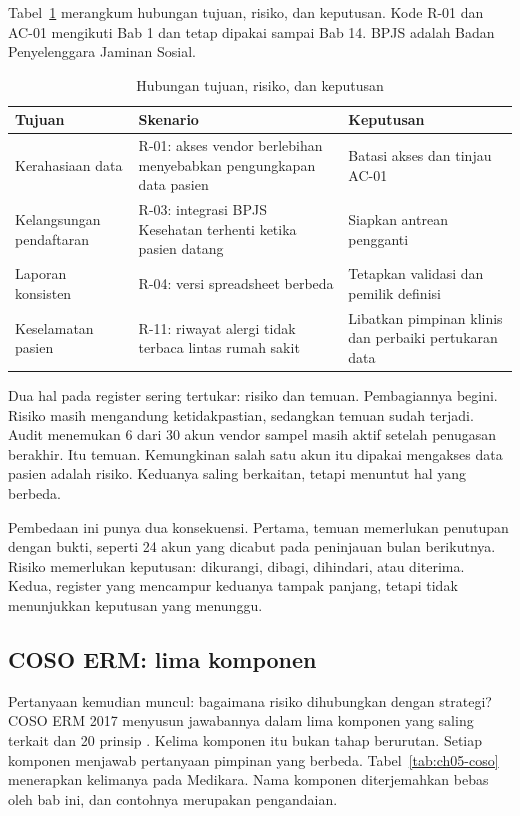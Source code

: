 Tabel~\ref{tab:ch05-tujuan} merangkum hubungan tujuan, risiko, dan keputusan. Kode R-01 dan AC-01
mengikuti Bab 1 dan tetap dipakai sampai Bab 14. BPJS adalah Badan Penyelenggara Jaminan Sosial.

\begin{table}[!htb]
  \centering\small
  \caption{Hubungan tujuan, risiko, dan keputusan}\label{tab:ch05-tujuan}
  \begin{tabularx}{\textwidth}{|>{\raggedright\arraybackslash}p{}|>{\raggedright\arraybackslash}X|>{\raggedright\arraybackslash}X|}
    \hline
    \textbf{Tujuan} & \textbf{Skenario} & \textbf{Keputusan} \\ \hline
    Kerahasiaan data & R-01: akses vendor berlebihan menyebabkan pengungkapan data pasien & Batasi
    akses dan tinjau AC-01 \\ \hline
    Kelangsungan pendaftaran & R-03: integrasi BPJS Kesehatan terhenti ketika pasien datang &
    Siapkan antrean pengganti \\ \hline
    Laporan konsisten & R-04: versi spreadsheet berbeda & Tetapkan validasi dan pemilik definisi \\
    \hline
    Keselamatan pasien & R-11: riwayat alergi tidak terbaca lintas rumah sakit & Libatkan pimpinan
    klinis dan perbaiki pertukaran data \\ \hline
  \end{tabularx}
\end{table}

Dua hal pada register sering tertukar: risiko dan temuan. Pembagiannya begini. Risiko masih
mengandung ketidakpastian, sedangkan temuan sudah terjadi. Audit menemukan 6 dari 30 akun vendor
sampel masih aktif setelah penugasan berakhir. Itu temuan. Kemungkinan salah satu akun itu dipakai
mengakses data pasien adalah risiko. Keduanya saling berkaitan, tetapi menuntut hal yang berbeda.

Pembedaan ini punya dua konsekuensi. Pertama, temuan memerlukan penutupan dengan bukti, seperti 24
akun yang dicabut pada peninjauan bulan berikutnya. Risiko memerlukan keputusan: dikurangi, dibagi,
dihindari, atau diterima. Kedua, register yang mencampur keduanya tampak panjang, tetapi tidak
menunjukkan keputusan yang menunggu.

\subsection*{COSO ERM: lima komponen}

Pertanyaan kemudian muncul: bagaimana risiko dihubungkan dengan strategi? COSO ERM 2017 menyusun
jawabannya dalam lima komponen yang saling terkait dan 20 prinsip \cite{cosoerm2017,c05-ncsu-coso}.
Kelima komponen itu bukan tahap berurutan. Setiap komponen menjawab pertanyaan pimpinan yang
berbeda. Tabel~\ref{tab:ch05-coso} menerapkan kelimanya pada Medikara. Nama komponen diterjemahkan
bebas oleh bab ini, dan contohnya merupakan pengandaian.


